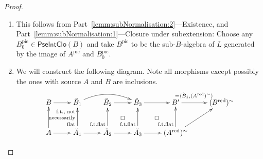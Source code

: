 \documentclass[10pt]{amsart}
\theoremstyle{definition}
\newcommand{\PN}{\mathsf{PseNor}}
\newcommand{\PIC}{\mathsf{PseIntClo}}
\newcommand{\red}{{\operatorname{red}}}
\newcommand{\pic}{{\operatorname{pic}}}
\begin{document}
\begin{proof}
\begin{enumerate}
 \item This follows from Part~\ref{lemm:subNormalisation:2}---Existence, and Part~\ref{lemm:subNormalisation:1}---Closure under subextension: Choose any $B^\pic_0 \in \PIC(B)$ and take $B^\pic$ to be the sub-$B$-algebra of $L$ generated by the image of $A^\pic$ and $B^\pic_0$. 

 \item %
We will construct the following diagram. Note all morphisms except possibly the ones with source $A$ and $B$ are inclusions. %
\[ \xymatrix{
B \ar[r]  & \breve{B}_1 \ar@/^12pt/[rr] & \breve{B}_2 \ar[r] & \breve{B}_3 \ar[r] & B' \ar[r] \ar@{}@<3pt>[r]^(0.4){= \langle \breve{B}_1, (A^\red)^\sim\rangle} & (B^\red)^\sim \\
A \ar[u] \ar[r] & \breve{A}_1 \ar[r] \ar[u]^(0.7){\textrm{f.t., not}}^{\textrm{necessarily}}^(0.3){\textrm{flat}} & \breve{A}_2 \ar[r] \ar[u]^(0.3){\textrm{f.t.flat}} \ar@{}[ur]|\square & \breve{A}_3 \ar[r] \ar[u]^(0.3){\textrm{f.t.flat}} \ar@{}[ur]|\square & (A^\red)^\sim \ar[u]^(0.3){\textrm{f.t.flat}} \ar[ur] 
} \]
 

\end{enumerate}
\end{proof}
\end{document}

